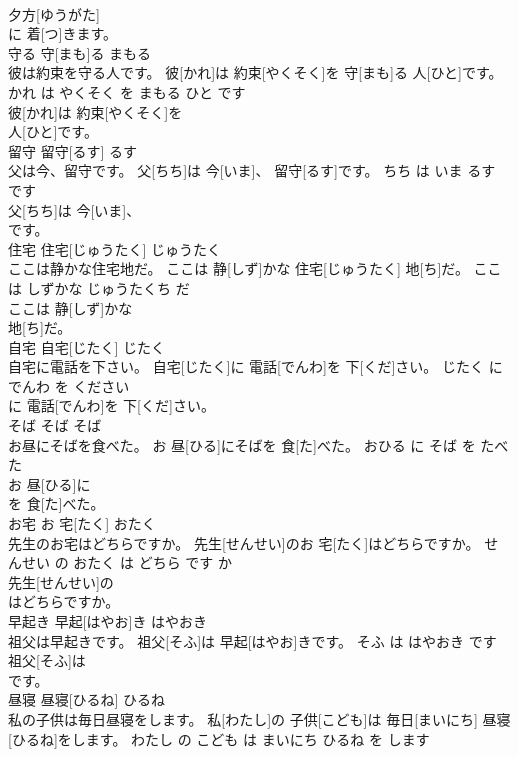 \documentclass[8pt]{extreport}
\begin{document}
\begin{CJK}{UTF8}{min}
\\	夕方[ゆうがた]
\\	に 着[つ]きます。			
\\	守る	守[まも]る	まもる	
\\	彼は約束を守る人です。	彼[かれ]は 約束[やくそく]を 守[まも]る 人[ひと]です。	かれ は やくそく を まもる ひと です	
\\	彼[かれ]は 約束[やくそく]を
\\	人[ひと]です。			
\\	留守	留守[るす]	るす	
\\	父は今、留守です。	父[ちち]は 今[いま]、 留守[るす]です。	ちち は いま るす です	
\\	父[ちち]は 今[いま]、
\\	です。			
\\	住宅	住宅[じゅうたく]	じゅうたく	
\\	ここは静かな住宅地だ。	ここは 静[しず]かな 住宅[じゅうたく] 地[ち]だ。	ここ は しずかな じゅうたくち だ	
\\	ここは 静[しず]かな
\\	地[ち]だ。			
\\	自宅	自宅[じたく]	じたく	
\\	自宅に電話を下さい。	自宅[じたく]に 電話[でんわ]を 下[くだ]さい。	じたく に でんわ を ください	
\\	に 電話[でんわ]を 下[くだ]さい。			
\\	そば	そば	そば	
\\	お昼にそばを食べた。	お 昼[ひる]にそばを 食[た]べた。	おひる に そば を たべた	
\\	お 昼[ひる]に
\\	を 食[た]べた。			
\\	お宅	お 宅[たく]	おたく	
\\	先生のお宅はどちらですか。	先生[せんせい]のお 宅[たく]はどちらですか。	せんせい の おたく は どちら です か	
\\	先生[せんせい]の
\\	はどちらですか。			
\\	早起き	早起[はやお]き	はやおき	
\\	祖父は早起きです。	祖父[そふ]は 早起[はやお]きです。	そふ は はやおき です	
\\	祖父[そふ]は
\\	です。			
\\	昼寝	昼寝[ひるね]	ひるね	
\\	私の子供は毎日昼寝をします。	私[わたし]の 子供[こども]は 毎日[まいにち] 昼寝[ひるね]をします。	わたし の こども は まいにち ひるね を します	

\end{CJK}
\end{document}
